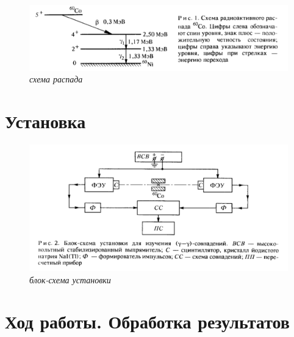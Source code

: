 \documentclass[a4paper,12pt]{article}
\theoremstyle{plain} %
\theoremstyle{definition} %
\theoremstyle{remark} %
\begin{document}
\begin{figure}[h!]
\centering
\includegraphics[scale=0.4]{1}
\caption{\textit{схема распада}} %
\end{figure} 

\section{Установка}

 \begin{figure}[H]
\centering
		\includegraphics[scale=0.4]{2}
\caption{\textit{блок-схема установки}} %
\end{figure}

\section{Ход работы. Обработка результатов}
\end{document}
